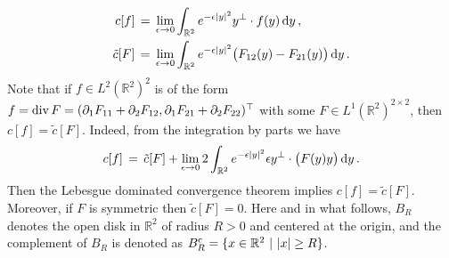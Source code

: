 \documentclass[11pt,a4paper]{article}
\newcommand{\R}{\mathbb{R}}
\newcommand{\dd}{\,{\rm d}}
\begin{document}
%
\begin{align}\label{def.c.tildec}
\begin{split}
c[f]  & \,=\, \lim_{\epsilon \rightarrow 0} \int_{\R^2} e^{-\epsilon |y|^2}  y^\bot \cdot f(y) \dd y\,,\\
\tilde c[F] & \,=\, \lim_{\epsilon \rightarrow 0} \int_{\R^2} e^{-\epsilon |y|^2}   \big( F_{12}(y) - F_{21}(y) \big) \dd y\,.
\end{split}
\end{align}
%
Note that if $f\in L^2 (\R^2)^2$ is of the form $f={\rm div}\, F=(\partial_1 F_{11}+\partial_2 F_{12}, \partial_1 F_{21}+\partial_2 F_{22})^\top$ with some $F\in L^1 (\R^2)^{2\times 2}$, then $c[f] = \tilde c[F]$. Indeed, from the integration by parts we have 
%
\begin{align*}
c[f] \,=\, 
\tilde c[F] 
+ \lim_{\epsilon \rightarrow 0} 2 \int_{\R^2} e^{-\epsilon |y|^2} \epsilon y^\bot  \cdot \big ( F (y)  y \big )  \dd y\,.
\end{align*} 
%
Then the Lebesgue dominated convergence theorem implies $c[f] = \tilde c[F]$. Moreover, if $F$ is symmetric then $\tilde c[F]=0$. Here and in what follows, $B_{R}$ denotes the open disk in $\R^2$ of radius $R>0$ and centered at the origin, and the complement of $B_{R}$ is denoted as $B^{{\rm c}}_{R} = \{ x \in \R^2 ~|~ |x| \ge R  \}$.
%
\end{document}
